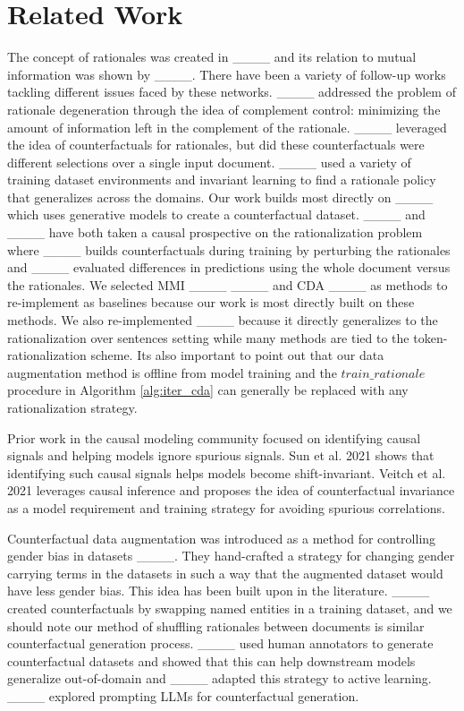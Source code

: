 \section{Related Work}
The concept of rationales was created in ____ and its relation to mutual information was shown by ____. There have been a variety of follow-up works tackling different issues faced by these networks. ____ addressed the problem of rationale degeneration through the idea of complement control: minimizing the amount of information left in the complement of the rationale. ____ leveraged the idea of counterfactuals for rationales, but did these counterfactuals were different selections over a single input document. ____ used a variety of training dataset environments and invariant learning to find a rationale policy that generalizes across the domains. Our work builds most directly on ____ which uses generative models to create a counterfactual dataset. ____ and ____ have both taken a causal prospective on the rationalization problem where ____ builds counterfactuals during training by perturbing the rationales and ____ evaluated differences in predictions using the whole document versus the rationales. We selected MMI ____ ____ and CDA ____ as methods to re-implement as baselines because our work is most directly built on these methods. We also re-implemented ____ because it directly generalizes to the rationalization over sentences setting while many methods are tied to the token-rationalization scheme. Its also important to point out that our data augmentation method is offline from model training and the $train\_rationale$ procedure in Algorithm \ref{alg:iter_cda} can generally be replaced with any rationalization strategy.

Prior work in the causal modeling community focused on identifying causal signals and helping models ignore spurious signals. Sun et al. 2021 shows that identifying such causal signals helps models become shift-invariant. Veitch et al. 2021 leverages causal inference and  proposes the idea of counterfactual invariance as a model requirement and training strategy for avoiding spurious correlations.

Counterfactual data augmentation was introduced as a method for controlling gender bias in datasets ____. They hand-crafted a strategy for changing gender carrying terms in the datasets in such a way that the augmented dataset would have less gender bias. This idea has been built upon in the literature. ____ created counterfactuals by swapping named entities in a training dataset, and we should note our method of shuffling rationales between documents is similar counterfactual generation process. ____ used human annotators to generate counterfactual datasets and showed that this can help downstream models generalize out-of-domain and ____ adapted this strategy to active learning. ____ explored prompting LLMs for counterfactual generation.